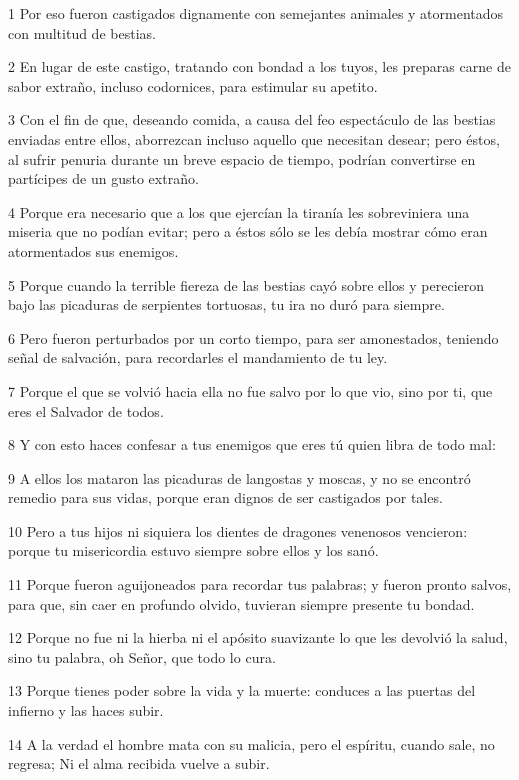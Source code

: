 \par 1 Por eso fueron castigados dignamente con semejantes animales y atormentados con multitud de bestias.
\par 2 En lugar de este castigo, tratando con bondad a los tuyos, les preparas carne de sabor extraño, incluso codornices, para estimular su apetito.
\par 3 Con el fin de que, deseando comida, a causa del feo espectáculo de las bestias enviadas entre ellos, aborrezcan incluso aquello que necesitan desear; pero éstos, al sufrir penuria durante un breve espacio de tiempo, podrían convertirse en partícipes de un gusto extraño.
\par 4 Porque era necesario que a los que ejercían la tiranía les sobreviniera una miseria que no podían evitar; pero a éstos sólo se les debía mostrar cómo eran atormentados sus enemigos.
\par 5 Porque cuando la terrible fiereza de las bestias cayó sobre ellos y perecieron bajo las picaduras de serpientes tortuosas, tu ira no duró para siempre.
\par 6 Pero fueron perturbados por un corto tiempo, para ser amonestados, teniendo señal de salvación, para recordarles el mandamiento de tu ley.
\par 7 Porque el que se volvió hacia ella no fue salvo por lo que vio, sino por ti, que eres el Salvador de todos.
\par 8 Y con esto haces confesar a tus enemigos que eres tú quien libra de todo mal:
\par 9 A ellos los mataron las picaduras de langostas y moscas, y no se encontró remedio para sus vidas, porque eran dignos de ser castigados por tales.
\par 10 Pero a tus hijos ni siquiera los dientes de dragones venenosos vencieron: porque tu misericordia estuvo siempre sobre ellos y los sanó.
\par 11 Porque fueron aguijoneados para recordar tus palabras; y fueron pronto salvos, para que, sin caer en profundo olvido, tuvieran siempre presente tu bondad.
\par 12 Porque no fue ni la hierba ni el apósito suavizante lo que les devolvió la salud, sino tu palabra, oh Señor, que todo lo cura.
\par 13 Porque tienes poder sobre la vida y la muerte: conduces a las puertas del infierno y las haces subir.
\par 14 A la verdad el hombre mata con su malicia, pero el espíritu, cuando sale, no regresa; Ni el alma recibida vuelve a subir.
